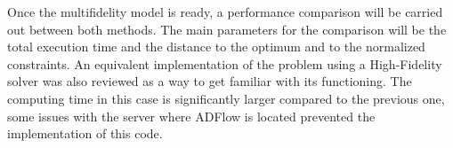 Once the multifidelity model is ready, a performance comparison will be carried out between both methods. The main parameters for the comparison will be the total execution time and the distance to the optimum and to the normalized constraints. An equivalent implementation of the problem using a High-Fidelity solver was also reviewed as a way to get familiar with its functioning. The computing time in this case is significantly larger compared to the previous one, some issues with the server where ADFlow is located prevented the implementation of this code.  


